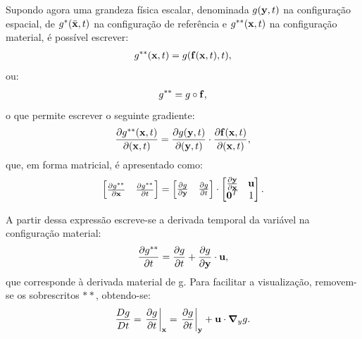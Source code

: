 Supondo agora uma grandeza física escalar, denominada $g(\mathbf{y},t)$ na configuração espacial, de $g^{*}(\bar{\mathbf{x}},t)$ na configuração de referência e $g^{**}(\mathbf{x},t)$ na configuração material, é possível escrever:
\begin{align}
	g^{**}(\mathbf{x},t) = g(\mathbf{f}(\mathbf{x},t),t), 
\end{align}
\noindent ou:
\begin{align}
	g^{**} = g  \circ \mathbf{f},
\end{align}
\noindent o que permite escrever o seguinte gradiente:
\begin{align}
	\frac{\partial g^{**}(\mathbf{x},t)}{\partial (\mathbf{x},t)} = \frac{\partial g(\mathbf{y},t)}{\partial (\mathbf{y},t)} \cdot \frac{\partial \mathbf{f}(\mathbf{x},t)}{\partial (\mathbf{x},t)},
\end{align}
\noindent que, em forma matricial, é apresentado como:
\begin{align}
	\begin{bmatrix}
		\frac{\partial {g^{**}}}{\partial {\mathbf{x}}} & \frac{\partial {g^{**}}}{\partial t} \\
	\end{bmatrix}
	=
	\begin{bmatrix}
		\frac{\partial {g}}{\partial \mathbf{y}} & \frac{\partial {g}}{\partial t} 
	\end{bmatrix}
	\cdot
	\begin{bmatrix}
		\frac{\partial {\mathbf{y}}}{\partial {\mathbf{x}}} & \mathbf{u} \\
		\mathbf{0}^T & 1 \\
	\end{bmatrix} .
\end{align}

A partir dessa expressão escreve-se a derivada temporal da variável na configuração material:
\begin{align}
	\frac{\partial g^{**}}{\partial t} = \frac{\partial g}{\partial t} + \frac{\partial g}{\partial \mathbf{y}} \cdot \mathbf{u}, 
\end{align}
\noindent que corresponde à derivada material de g. Para facilitar a visualização, removem-se os sobrescritos $**$, obtendo-se:
\begin{align}
	\frac{Dg}{Dt} = \left . \frac{\partial g}{\partial t} \right|_{\mathbf{x}} = \left . \frac{\partial g}{\partial t} \right|_{\mathbf{y}} + \mathbf{u} \cdot \boldsymbol{\nabla}_y g. \label{eq:der_mat}
\end{align}

